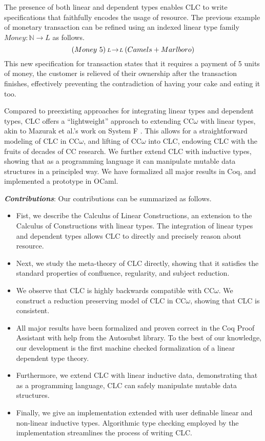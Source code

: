 \documentclass{article}
\theoremstyle{definition}
\newcommand{\arw}[2]
{\hspace*{0.2em}{\scriptstyle #1}\hspace*{-0.2em}
\rightarrow
\hspace*{-0.2em}{\scriptstyle #2}\hspace*{0.2em}}
\begin{document}
  The presence of both linear and dependent types enables CLC to write specifications that faithfully encodes the usage of resource. The previous example of monetary transaction can be refined using an indexed linear type family $Money : \mathbb{N} \rightarrow L$ as follows.
  \begin{equation*}
    (Money\ 5) \arw{L}{L} (Camels + Marlboro)
  \end{equation*}
  This new specification for transaction states that it requires a payment of 5 units of money, the customer is relieved of their ownership after the transaction finishes, effectively preventing the contradiction of having your cake and eating it too.

  Compared to preexisting approaches for integrating linear types and dependent types, CLC offers a ``lightweight'' approach to extending CC$\omega$ with linear types, akin to Mazurak et al.'s work on System F \cite{mazurak}. This allows for a straightforward modeling of CLC in CC$\omega$, and lifting of CC$\omega$ into CLC, endowing CLC with the fruits of decades of CC research. We further extend CLC with inductive types, showing that as a programming language it can manipulate mutable data structures in a principled way. We have formalized all major results in Coq, and implemented a prototype in OCaml. 

  \medskip

  \noindent \textbf{\textit{Contributions}}: 
  Our contributions can be summarized as follows.
  \begin{itemize}
    \item Fist, we describe the Calculus of Linear Constructions, an extension to the Calculus of Constructions with linear types. The integration of linear types and dependent types allows CLC to directly and precisely reason about resource.
    \item Next, we study the meta-theory of CLC directly, showing that it satisfies the standard properties of confluence, regularity, and subject reduction. 
    \item We observe that CLC is highly backwards compatible with CC$\omega$. We construct a reduction preserving model of CLC in CC$\omega$, showing that CLC is consistent. 
    \item All major results have been formalized and proven correct in the Coq Proof Assistant with help from the Autosubst \cite{autosubst} library. To the best of our knowledge, our development is the first machine checked formalization of a linear dependent type theory.
    \item Furthermore, we extend CLC with linear inductive data, demonstrating that as a programming language, CLC can safely manipulate mutable data structures.
    \item Finally, we give an implementation extended with user definable linear and non-linear inductive types. Algorithmic type checking employed by the implementation streamlines the process of writing CLC.
  \end{itemize}
\end{document}
